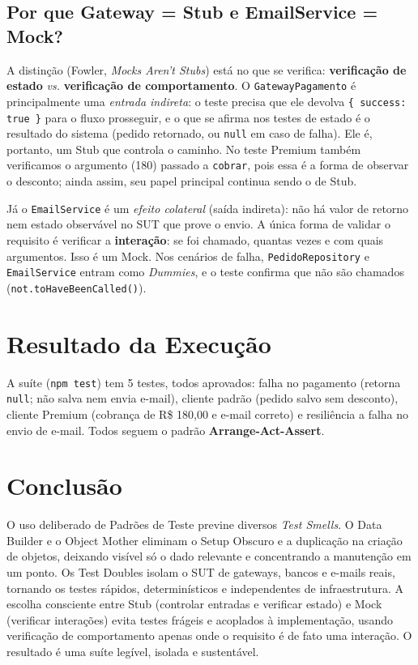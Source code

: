 \documentclass[11pt,a4paper]{article}
\begin{document}
\subsection{Por que Gateway = Stub e EmailService = Mock?}
A distinção (Fowler, \emph{Mocks Aren't Stubs}) está no que se verifica: \textbf{verificação de estado} \emph{vs.} \textbf{verificação de comportamento}. O \texttt{GatewayPagamento} é principalmente uma \emph{entrada indireta}: o teste precisa que ele devolva \texttt{\{ success: true \}} para o fluxo prosseguir, e o que se afirma nos testes de estado é o resultado do sistema (pedido retornado, ou \texttt{null} em caso de falha). Ele é, portanto, um Stub que controla o caminho. No teste Premium também verificamos o argumento (180) passado a \texttt{cobrar}, pois essa é a forma de observar o desconto; ainda assim, seu papel principal continua sendo o de Stub.

Já o \texttt{EmailService} é um \emph{efeito colateral} (saída indireta): não há valor de retorno nem estado observável no SUT que prove o envio. A única forma de validar o requisito é verificar a \textbf{interação}: se foi chamado, quantas vezes e com quais argumentos. Isso é um Mock. Nos cenários de falha, \texttt{PedidoRepository} e \texttt{EmailService} entram como \emph{Dummies}, e o teste confirma que não são chamados (\texttt{not.toHaveBeenCalled()}).

\section{Resultado da Execução}
A suíte (\texttt{npm test}) tem 5 testes, todos aprovados: falha no pagamento (retorna \texttt{null}; não salva nem envia e-mail), cliente padrão (pedido salvo sem desconto), cliente Premium (cobrança de R\$ 180,00 e e-mail correto) e resiliência a falha no envio de e-mail. Todos seguem o padrão \textbf{Arrange-Act-Assert}.

\section{Conclusão}
O uso deliberado de Padrões de Teste previne diversos \emph{Test Smells}. O Data Builder e o Object Mother eliminam o Setup Obscuro e a duplicação na criação de objetos, deixando visível só o dado relevante e concentrando a manutenção em um ponto. Os Test Doubles isolam o SUT de gateways, bancos e e-mails reais, tornando os testes rápidos, determinísticos e independentes de infraestrutura. A escolha consciente entre Stub (controlar entradas e verificar estado) e Mock (verificar interações) evita testes frágeis e acoplados à implementação, usando verificação de comportamento apenas onde o requisito é de fato uma interação. O resultado é uma suíte legível, isolada e sustentável.
\end{document}
